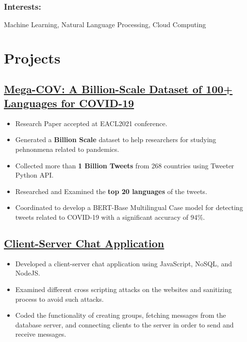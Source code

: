 \documentclass[a4paper,11pt]{article}
\begin{document}
\subsubsection{Interests: }\hspace{0.4em}Machine Learning, Natural Language Processing, Cloud Computing
\section{Projects}
\subsection{\href{https://arxiv.org/abs/2005.06012}{Mega-COV: A Billion-Scale Dataset of 100+ Languages for COVID-19}}
\begin{itemize}
    \item Research Paper accepted at EACL2021 conference.
    \item Generated a \textbf{Billion Scale} dataset to help researchers for studying pehnonmena related to pandemics.
    \item Collected more than \textbf{1 Billion Tweets} from 268 countries using Tweeter Python API.
    \item Researched and Examined the \textbf{top 20 languages} of the tweets.
    \item Coordinated to develop a BERT-Base Multilingual Case model for detecting tweets related to COVID-19 with a significant accuracy of 94\%.
\end{itemize}
\subsection{\href{https://github.com/vkunal1996/CPEN400-ChatApp}{Client-Server Chat Application}}
\begin{itemize}
    \item Developed a client-server chat application using JavaScript, NoSQL, and NodeJS.
    \item Examined different cross scripting attacks on the websites and sanitizing process to avoid such attacks.
    \item Coded the functionality of creating groups, fetching messages from the database server, and connecting clients to the server in order to send and receive messages.
\end{itemize}
\end{document}
